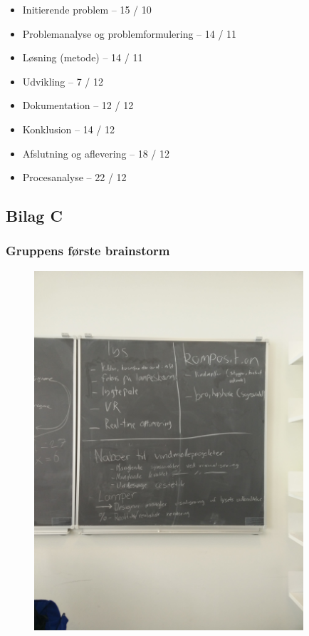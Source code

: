 \documentclass[oneside,a4paper,titlepage]{article}
\begin{document}
\begin{itemize}
\item Initierende problem – 15 / 10
\item Problemanalyse og problemformulering – 14 / 11
\item Løsning (metode) – 14 / 11
\item Udvikling – 7 / 12
\item Dokumentation – 12 / 12
\item Konklusion – 14 / 12
\item Afslutning og aflevering – 18 / 12
\item Procesanalyse – 22 / 12
\end{itemize}

\subsection{Bilag C}

\subsubsection*{Gruppens første brainstorm}
\label{sec:brainstorm}

\begin{figure}[H]
   \centering
   \includegraphics[width=10cm]{./../graphics/brainstorm_1}
\end{figure}
\end{document}
